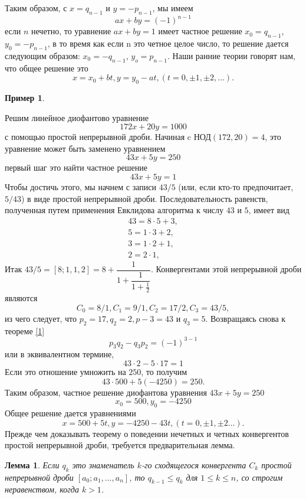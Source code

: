 \documentclass[a4paper,12pt]{article}
\newtheorem{lemma}[theorem]{Лемма}
\newtheorem*{remark}{Пример}
\renewcommand{\headrulewidth}{0pt}
\begin{document}
 Таким образом, с $x = q_{n-1}$ и $y = - p_{n-1}$, мы имеем
 \[a x + b y = (-1)^{n-1}\]
 если $n$ нечетно, то уравнение $a x + b y = 1$ имеет частное решение 
 $x_0 = q_{n-1} $, $y_0 = -p_{n-1}$, в то время как если n это четное целое число, то решение дается следующим образом: $x_0 = -q_{n-1}$, $y_o = p_{n-1}$. Наши ранние теории говорят нам, что общее решение это 
 	 \[x = x_0 + b t, y = y_0 - a t,  (t=0, \pm1,\pm2, \ldots).\]
 	 \begin{remark}\end{remark}
 	 Решим линейное диофантово уравнение
 	 \[172x + 20y = 1000\]
 	 с помощью простой непрерывной дроби. Начиная c $\text{НОД}(172, 20) = 4$, это уравнение может быть заменено уравнением
 	 \[43 x + 5 y = 250\]
 	 первый шаг это найти частное решение
 	 \[43 x + 5 y = 1\]
 	 Чтобы достичь этого, мы начнем с записи $43/5$ (или, если кто-то предпочитает, $5/43$) в виде простой непрерывной дроби. Последовательность равенств, полученная путем применения Евклидова алгоритма к числу $43$ и $5$, имеет вид
 	 \begin{equation} \begin{split}
 	 	43 = 8\cdotp5 + 3,\\
 	 	5 = 1\cdotp3 + 2,\\
 	 	3=1\cdotp2 + 1,\\
 	 	2=2\cdotp1,
 	 \end{split} \end{equation}
 	 \newpage
 	 \renewcommand{\headrulewidth}{0pt}
 	 \lhead{\textbf{\thepage}}
 	 \setcounter{page}{310}
Итак $43/5 = [8;1, 1, 2] = 8 + \dfrac{1}{1+\dfrac{1}{1 + \frac{1}{2}}}$. Конвергентами этой непрерывной дроби являются
\[C_0 = 8/1, C_1 = 9/1, C_2 = 17/2, C_3 = 43/5,\]
из чего следует, что $p_2 = 17, q_2 = 2, p-3 = 43$ и $q_3 = 5$. Возвращаясь снова к теореме \ref{1}
\[p_3 q_2 - q_3 p_2 = (-1)^{3-1}\]
или в эквивалентном термине,
\[43 \cdotp 2 - 5\cdotp17 = 1\]
Если это отношение умножить на $250$, то получим
\[43\cdotp500 + 5(-4250) = 250.\]
Таким образом, частное решение диофантова уравнения $43 x +5 y =250$
\[x_0 = 500, y_0 = -4250\]
Общее решение дается уравнениями
\[x = 500 + 5 t , y = -4250 - 43 t, (t = 0, \pm1, \pm2 \ldots).\]
\indent Прежде чем доказывать теорему о поведении нечетных и четных конвергентов простой непрерывной дроби, требуется предварительная лемма.\\
\begin{lemma} Если $q_k$ это знаменатель $k$-го сходящегося конвергента $C_k$ простой непрерывной дроби $[a_0; a_1, \ldots , a_n]$, то $q_{k-1} \leq q_k$ для $1\leq k\leq n$, со строгим неравенством, когда $k>1$. \end{lemma}
\end{document}
